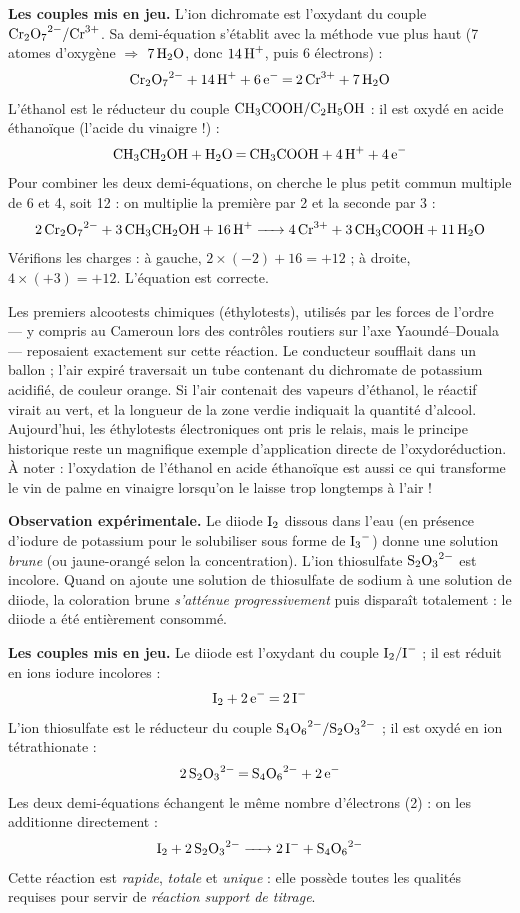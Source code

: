 \documentclass[11pt]{article}
\newcommand{\cle}[1]{{\popxbold\color{popdark}#1}}
\newcounter{popsec}
\newcounter{popsub}
\newcommand{\courssub}[1]{%
  \stepcounter{popsub}%
  \par\vspace{9pt}\noindent{\popxbold\fontsize{11.5}{13}\selectfont\color{popink}{\color{poporange}\thepopsec.\thepopsub}\hspace{6pt}#1}\par\nopagebreak\vspace{4pt}
}
\begin{document}
\textbf{Les couples mis en jeu.} L'ion dichromate est l'oxydant du couple $\ce{Cr2O7^2-}/\ce{Cr^3+}$. Sa demi-équation s'établit avec la méthode vue plus haut (7 atomes d'oxygène $\Rightarrow$ $7\,\ce{H2O}$, donc $14\,\ce{H+}$, puis 6 électrons) :
\[ \ce{Cr2O7^2- + 14H+ + 6e- = 2Cr^3+ + 7H2O} \]
L'éthanol est le réducteur du couple $\ce{CH3COOH}/\ce{C2H5OH}$ : il est oxydé en \cle{acide éthanoïque} (l'acide du vinaigre !) :
\[ \ce{CH3CH2OH + H2O = CH3COOH + 4H+ + 4e-} \]
Pour combiner les deux demi-équations, on cherche le plus petit commun multiple de 6 et 4, soit 12 : on multiplie la première par 2 et la seconde par 3 :
\[ \ce{2Cr2O7^2- + 3CH3CH2OH + 16H+ -> 4Cr^3+ + 3CH3COOH + 11H2O} \]
Vérifions les charges : à gauche, $2\times(-2) + 16 = +12$ ; à droite, $4\times(+3) = +12$. L'équation est correcte.

\begin{savaistu}
Les premiers alcootests chimiques (éthylotests), utilisés par les forces de l'ordre — y compris au Cameroun lors des contrôles routiers sur l'axe Yaoundé--Douala — reposaient exactement sur cette réaction. Le conducteur soufflait dans un ballon ; l'air expiré traversait un tube contenant du dichromate de potassium acidifié, de couleur orange. Si l'air contenait des vapeurs d'éthanol, le réactif virait au vert, et la longueur de la zone verdie indiquait la quantité d'alcool. Aujourd'hui, les éthylotests électroniques ont pris le relais, mais le principe historique reste un magnifique exemple d'application directe de l'oxydoréduction. À noter : l'oxydation de l'éthanol en acide éthanoïque est aussi ce qui transforme le vin de palme en vinaigre lorsqu'on le laisse trop longtemps à l'air !
\end{savaistu}

\courssub{Réaction entre le diiode et les ions thiosulfate}

\textbf{Observation expérimentale.} Le diiode $\ce{I2}$ dissous dans l'eau (en présence d'iodure de potassium pour le solubiliser sous forme de $\ce{I3-}$) donne une solution \emph{brune} (ou jaune-orangé selon la concentration). L'ion \cle{thiosulfate} $\ce{S2O3^2-}$ est incolore. Quand on ajoute une solution de thiosulfate de sodium à une solution de diiode, la coloration brune \emph{s'atténue progressivement} puis disparaît totalement : le diiode a été entièrement consommé.

\textbf{Les couples mis en jeu.} Le diiode est l'oxydant du couple $\ce{I2}/\ce{I-}$ ; il est réduit en ions iodure incolores :
\[ \ce{I2 + 2e- = 2I-} \]
L'ion thiosulfate est le réducteur du couple $\ce{S4O6^2-}/\ce{S2O3^2-}$ ; il est oxydé en ion \cle{tétrathionate} :
\[ \ce{2S2O3^2- = S4O6^2- + 2e-} \]
Les deux demi-équations échangent le même nombre d'électrons (2) : on les additionne directement :
\[ \ce{I2 + 2S2O3^2- -> 2I- + S4O6^2-} \]
Cette réaction est \emph{rapide}, \emph{totale} et \emph{unique} : elle possède toutes les qualités requises pour servir de \emph{réaction support de titrage}.
\end{document}

